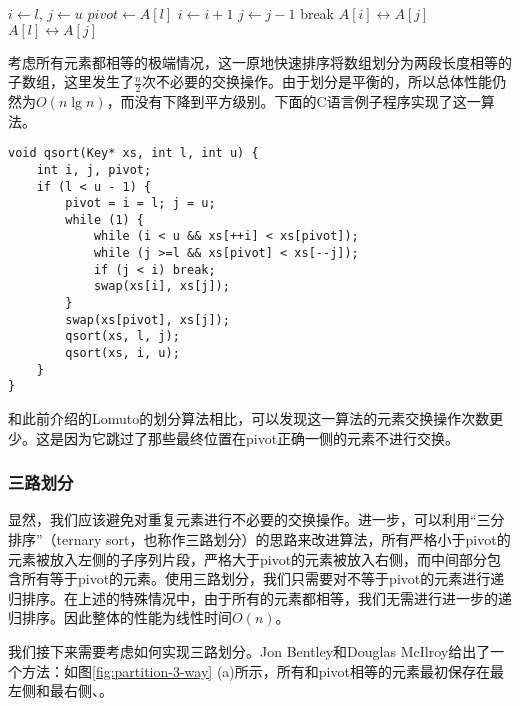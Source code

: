 \documentclass{ctexart}
\begin{document}
\begin{algorithmic}[1]
 \Comment{sort range $[l, u)$}
   
    \State $i \gets l$, $j \gets u$
    \State $pivot \gets A[l]$
    \Loop
      \Repeat
        \State $i \gets i + 1$
       
      \Repeat
        \State $j \gets j - 1$
       
        \State break
      \EndIf
      \State {} $A[i] \leftrightarrow A[j]$
    \EndLoop
    \State {} $A[l] \leftrightarrow A[j]$ 
    \State {}
    \State {}
  \EndIf
\EndProcedure
\end{algorithmic}

考虑所有元素都相等的极端情况，这一原地快速排序将数组划分为两段长度相等的子数组，这里发生了$\frac{n}{2}$次不必要的交换操作。由于划分是平衡的，所以总体性能仍然为$O(n \lg n)$，而没有下降到平方级别。下面的C语言例子程序实现了这一算法。

\lstset{language=C}
\begin{lstlisting}
void qsort(Key* xs, int l, int u) {
    int i, j, pivot;
    if (l < u - 1) {
        pivot = i = l; j = u;
        while (1) {
            while (i < u && xs[++i] < xs[pivot]);
            while (j >=l && xs[pivot] < xs[--j]);
            if (j < i) break;
            swap(xs[i], xs[j]);
        }
        swap(xs[pivot], xs[j]);
        qsort(xs, l, j);
        qsort(xs, i, u);
    }
}
\end{lstlisting}

和此前介绍的Lomuto的划分算法相比，可以发现这一算法的元素交换操作次数更少。这是因为它跳过了那些最终位置在pivot正确一侧的元素不进行交换。

\subsubsection{三路划分}

显然，我们应该避免对重复元素进行不必要的交换操作。进一步，可以利用“三分排序”（ternary sort，也称作三路划分）的思路来改进算法，所有严格小于pivot的元素被放入左侧的子序列片段，严格大于pivot的元素被放入右侧，而中间部分包含所有等于pivot的元素。使用三路划分，我们只需要对不等于pivot的元素进行递归排序。在上述的特殊情况中，由于所有的元素都相等，我们无需进行进一步的递归排序。因此整体的性能为线性时间$O(n)$。

我们接下来需要考虑如何实现三路划分。Jon Bentley和Douglas McIlroy给出了一个方法：如图\ref{fig:partition-3-way} (a)所示，所有和pivot相等的元素最初保存在最左侧和最右侧\cite{3-way-part}、\cite{opt-qs}。
\end{document}
